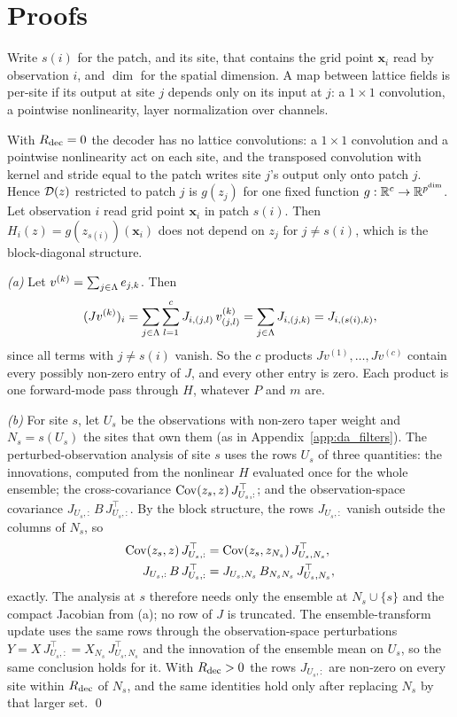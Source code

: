 \section{Proofs}
\label{app:proof}

Write $s(i)$ for the patch, and its site, that contains the grid point
$\bm x_i$ read by observation $i$, and $\dim$ for the spatial dimension. A
map between lattice fields is per-site if its output at site $j$ depends
only on its input at $j$: a $1\times1$ convolution, a pointwise
nonlinearity, layer normalization over channels.

With $R_{\mathrm{dec}}=0$ the decoder has no lattice convolutions: a $1\times1$
convolution and a pointwise nonlinearity act on each site, and the
transposed convolution with kernel and stride equal to the patch writes
site $j$'s output only onto patch $j$. Hence $\mathcal{D}(z)$ restricted to patch
$j$ is $g(z_j)$ for one fixed function $g:\mathbb{R}^c\to\mathbb{R}^{p^{\dim}}$. Let
observation $i$ read grid point $\bm{x}_i$ in patch $s(i)$. Then
$H_i(z)=g(z_{s(i)})(\bm{x}_i)$ does not depend on $z_j$ for $j\ne s(i)$,
which is the block-diagonal structure.

\emph{(a)} Let $v^{(k)}=\sum_{j\in\Lambda}e_{j,k}$. Then
\[
  (Jv^{(k)})_i = \sum_{j\in\Lambda}\sum_{l=1}^{c} J_{i,(j,l)}\,v^{(k)}_{(j,l)}
  = \sum_{j\in\Lambda} J_{i,(j,k)} = J_{i,(s(i),k)},
\]
since all terms with $j\ne s(i)$ vanish. So the $c$ products
$Jv^{(1)},\dots,Jv^{(c)}$ contain every possibly non-zero entry of $J$,
and every other entry is zero. Each product is one forward-mode pass
through $H$, whatever $P$ and $m$ are.

\emph{(b)} For site $s$, let $U_s$ be the observations with non-zero
taper weight and $N_s=s(U_s)$ the sites that own them (as in Appendix~\ref{app:da_filters}). The
perturbed-observation analysis of site $s$ uses the rows $U_s$ of three
quantities: the innovations, computed from the nonlinear $H$ evaluated
once for the whole ensemble; the cross-covariance
$\operatorname{Cov}(z_s, z)\,J_{U_s,:}^{\top}$; and the observation-space covariance
$J_{U_s,:}\,B\,J_{U_s,:}^{\top}$. By the block structure, the rows
$J_{U_s,:}$ vanish outside the columns of $N_s$, so
\[
\begin{aligned}
  \operatorname{Cov}(z_s,z)\,J_{U_s,:}^{\top} &= \operatorname{Cov}(z_s,z_{N_s})\,J_{U_s,N_s}^{\top},\\
  J_{U_s,:}\,B\,J_{U_s,:}^{\top} &= J_{U_s,N_s}\,B_{N_sN_s}\,J_{U_s,N_s}^{\top},
\end{aligned}
\]
exactly. The analysis at $s$ therefore needs only the ensemble at
$N_s\cup\{s\}$ and the compact Jacobian from (a); no row of $J$ is
truncated. The ensemble-transform update uses the same rows through the
observation-space perturbations $Y = X\,J_{U_s,:}^{\top} = X_{N_s}\,J_{U_s,N_s}^{\top}$
and the innovation of the ensemble mean on $U_s$, so the same conclusion
holds for it. With $R_{\mathrm{dec}}>0$ the rows $J_{U_s,:}$ are non-zero on every site
within $R_{\mathrm{dec}}$ of $N_s$, and the same identities hold only after replacing
$N_s$ by that larger set. \qed

